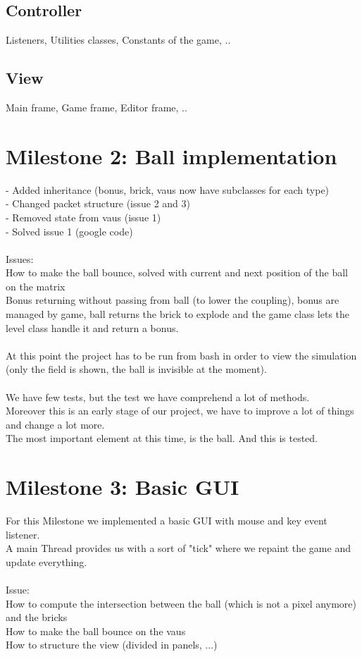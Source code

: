\subsection*{Controller}
Listeners, Utilities classes, Constants of the game, .. 

\subsection*{View}
Main frame, Game frame, Editor frame, ..

\section*{Milestone 2: Ball implementation}
\label{sec:m2}
- Added inheritance (bonus, brick, vaus now have subclasses for each type)\\
- Changed packet structure (issue 2 and 3)\\
- Removed state from vaus (issue 1)\\
- Solved issue 1 (google code)\\
\\
Issues:\\
How to make the ball bounce, solved with current and next position of the ball on the matrix\\
Bonus returning without passing from ball (to lower the coupling), bonus are managed by game, ball returns the brick to explode and the game class lets the level class handle it and return a bonus.\\
\\
At this point the project has to be run from bash in order to view the simulation (only the field is shown, the ball is invisible at the moment).\\
\\
We have few tests, but the test we have comprehend a lot of methods.\\
Moreover this is an early stage of our project, we have to improve a lot of things and change a lot more.\\
The most important element at this time, is the ball. And this is tested.

\section*{Milestone 3: Basic GUI}
\label{sec:m3}
For this Milestone we implemented a basic GUI with mouse and key event listener.\\
A main Thread provides us with a sort of "tick" where we repaint the game and update everything.\\
\\
Issue:\\
How to compute the intersection between the ball (which is not a pixel anymore) and the bricks\\
How to make the ball bounce on the vaus\\
How to structure the view (divided in panels, ...)\\

